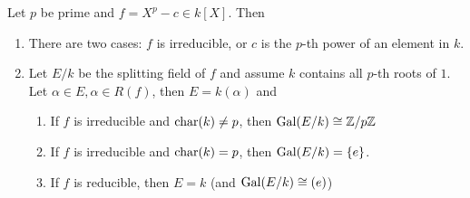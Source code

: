 \begin{lem}[]\label{lem:prime-polynomial}
  Let $p$ be prime and $f = X^{p} - c \in k[X]$. Then
  \begin{enumerate}
    \item There are two cases: $f$ is irreducible, or $c$ is the $p$-th power of an element in $k$.
    \item Let $E/k$ be the splitting field of $f$ and assume $k$ contains all $p$-th roots of $1$.
      Let $\alpha \in E, \alpha \in R(f)$, then $E = k(\alpha)$ and
      \begin{enumerate}
        \item If $f$ is irreducible and $\operatorname{char}(k) \neq p$, then $\operatorname{Gal}(E/k) \cong \mathbb{Z}/p\mathbb{Z}$
        \item If $f$ is irreducible and $\operatorname{char}(k) = p$, then $\operatorname{Gal}(E/k) = \{e\}$.
        \item If $f$ is reducible, then $E = k$ (and $\operatorname{Gal}(E/k) \cong (e)$)
      \end{enumerate}
  \end{enumerate}
\end{lem}

